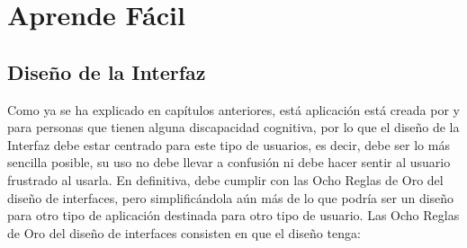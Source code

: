 \chapter{Aprende Fácil}
\label{cap:aprendeFacil}




\section{Diseño de la Interfaz}
\label{cap:sec:disenioInterfaz}
Como ya se ha explicado en capítulos anteriores, está aplicación está creada por y para personas que tienen alguna discapacidad cognitiva, por lo que el diseño de la Interfaz debe estar centrado para este tipo de usuarios, es decir, debe ser lo más sencilla posible, su uso no debe llevar a confusión ni debe hacer sentir al usuario frustrado al usarla. En definitiva, debe cumplir con las Ocho Reglas de Oro del diseño de interfaces, pero simplificándola aún más de lo que podría ser un diseño para otro tipo de aplicación destinada para otro tipo de usuario. 
Las Ocho Reglas de Oro del diseño de interfaces consisten en que el diseño tenga:
